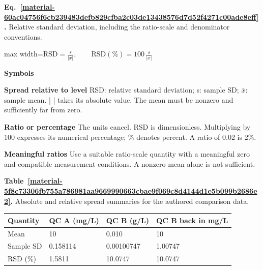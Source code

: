 \documentclass[11pt,a4paper]{article}
\newcounter{scripttable}
\begin{document}
\par\medskip
\begin{samepage}
\label{material-60ac04756f6cb239483defb829cfba2c03de13438576d7d52f4271c00ade8eff}
\noindent\textbf{Eq.~\ref*{material-60ac04756f6cb239483defb829cfba2c03de13438576d7d52f4271c00ade8eff}.} Relative standard deviation, including the ratio-scale and denominator conventions.\par\nopagebreak
\begin{center}\begin{adjustbox}{max width=\linewidth}$\displaystyle \mathrm{RSD}=\frac{s}{|\bar{x}|},\qquad\mathrm{RSD}(\%)=100\,\frac{s}{|\bar{x}|}$\end{adjustbox}\end{center}

\par\noindent\textbf{Symbols}

\par\noindent\textbf{Spread relative to level} RSD: relative standard deviation; s: sample SD; \ensuremath{\bar{x}}: sample mean. | | takes its absolute value. The mean must be nonzero and sufficiently far from zero.

\par\noindent\textbf{Ratio or percentage} The units cancel. RSD is dimensionless. Multiplying by 100 expresses its numerical percentage; \% denotes percent. A ratio of 0.02 is 2\%.

\par\noindent\textbf{Meaningful ratios} Use a suitable ratio-scale quantity with a meaningful zero and compatible measurement conditions. A nonzero mean alone is not sufficient.

\end{samepage}
\medskip

\par\medskip
{}
\label{material-5f8c73306fb755a786981aa9669990663cbae9f069c8d4144d1e5b099b2686e2}
\noindent\textbf{Table~\ref*{material-5f8c73306fb755a786981aa9669990663cbae9f069c8d4144d1e5b099b2686e2}.} Absolute and relative spread summaries for the authored comparison data.\par\nopagebreak
\begin{longtable}{@{}p{}p{}p{}p{}@{}}
Quantity & QC A (mg/L) & QC B (g/L) & QC B back in mg/L \\ \hline
\endhead
Mean & 10 & 0.010 & 10 \\ \hline
Sample SD & 0.158114 & 0.00100747 & 1.00747 \\ \hline
RSD (\%) & 1.5811 & 10.0747 & 10.0747 \\ \hline
\end{longtable}
\medskip
\end{document}
